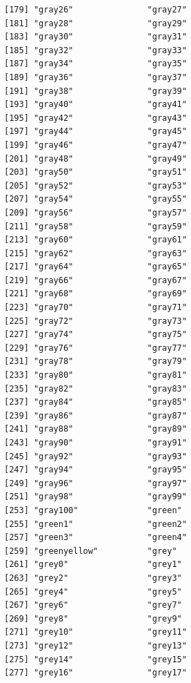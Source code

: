 \documentclass[
  a4paper,
]{article}
\begin{document}
\begin{verbatim}
[179] "gray26"               "gray27"              
[181] "gray28"               "gray29"              
[183] "gray30"               "gray31"              
[185] "gray32"               "gray33"              
[187] "gray34"               "gray35"              
[189] "gray36"               "gray37"              
[191] "gray38"               "gray39"              
[193] "gray40"               "gray41"              
[195] "gray42"               "gray43"              
[197] "gray44"               "gray45"              
[199] "gray46"               "gray47"              
[201] "gray48"               "gray49"              
[203] "gray50"               "gray51"              
[205] "gray52"               "gray53"              
[207] "gray54"               "gray55"              
[209] "gray56"               "gray57"              
[211] "gray58"               "gray59"              
[213] "gray60"               "gray61"              
[215] "gray62"               "gray63"              
[217] "gray64"               "gray65"              
[219] "gray66"               "gray67"              
[221] "gray68"               "gray69"              
[223] "gray70"               "gray71"              
[225] "gray72"               "gray73"              
[227] "gray74"               "gray75"              
[229] "gray76"               "gray77"              
[231] "gray78"               "gray79"              
[233] "gray80"               "gray81"              
[235] "gray82"               "gray83"              
[237] "gray84"               "gray85"              
[239] "gray86"               "gray87"              
[241] "gray88"               "gray89"              
[243] "gray90"               "gray91"              
[245] "gray92"               "gray93"              
[247] "gray94"               "gray95"              
[249] "gray96"               "gray97"              
[251] "gray98"               "gray99"              
[253] "gray100"              "green"               
[255] "green1"               "green2"              
[257] "green3"               "green4"              
[259] "greenyellow"          "grey"                
[261] "grey0"                "grey1"               
[263] "grey2"                "grey3"               
[265] "grey4"                "grey5"               
[267] "grey6"                "grey7"               
[269] "grey8"                "grey9"               
[271] "grey10"               "grey11"              
[273] "grey12"               "grey13"              
[275] "grey14"               "grey15"              
[277] "grey16"               "grey17"              

\end{verbatim}
\end{document}
